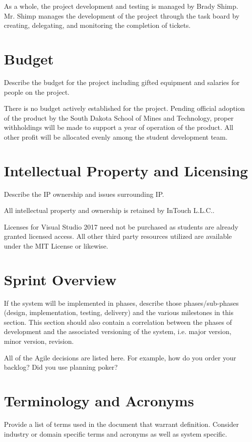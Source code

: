 As a whole, the project development and testing is managed by Brady Shimp. Mr. Shimp manages the development of the project through the task board by creating, delegating, and monitoring the completion of tickets. 

\section{Budget}
Describe the budget for the project including gifted equipment and salaries for 
people on the project.

There is no budget actively established for the project. Pending official adoption of the product by the South Dakota School of Mines and Technology, proper withholdings will be made to support a year of operation of the product. All other profit will be allocated evenly among the student development team. 

\section{Intellectual Property and Licensing}
Describe the IP ownership and issues surrounding IP.

All intellectual property and ownership is retained by InTouch L.L.C.. 

Licenses for Visual Studio 2017 need not be purchased as students are already granted licensed access. All other third party resources utilized are available under the MIT License or likewise. 


\section{Sprint  Overview}
If the system will be implemented in phases, describe those phases/sub-phases (design, 
implementation, testing, delivery) and the various milestones in this section. 
 This section should also contain a correlation between the phases of development 
and the associated versioning of the system, i.e. major version, minor version, 
revision. 

All of the Agile decisions are listed here.  For example, how do you order your backlog?   
Did you use planning poker?   

\section{Terminology and Acronyms}
Provide a list of terms used in the document that warrant definition.  Consider 
industry or domain specific terms and acronyms as well as system specific. 

